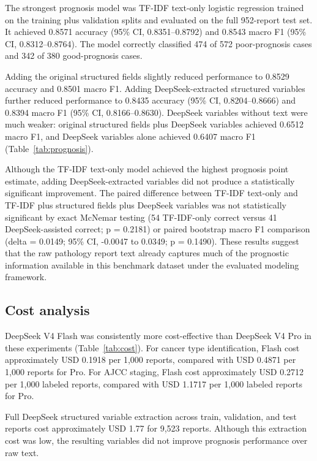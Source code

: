 \documentclass[pdflatex,sn-vancouver-num]{sn-jnl}
\begin{document}
The strongest prognosis model was TF-IDF text-only logistic regression trained on the training plus validation splits and evaluated on the full 952-report test set. It achieved 0.8571 accuracy (95\% CI, 0.8351--0.8792) and 0.8543 macro F1 (95\% CI, 0.8312--0.8764). The model correctly classified 474 of 572 poor-prognosis cases and 342 of 380 good-prognosis cases.

Adding the original structured fields slightly reduced performance to 0.8529 accuracy and 0.8501 macro F1. Adding DeepSeek-extracted structured variables further reduced performance to 0.8435 accuracy (95\% CI, 0.8204--0.8666) and 0.8394 macro F1 (95\% CI, 0.8166--0.8630). DeepSeek variables without text were much weaker: original structured fields plus DeepSeek variables achieved 0.6512 macro F1, and DeepSeek variables alone achieved 0.6407 macro F1 (Table~\ref{tab:prognosis}).

Although the TF-IDF text-only model achieved the highest prognosis point estimate, adding DeepSeek-extracted variables did not produce a statistically significant improvement. The paired difference between TF-IDF text-only and TF-IDF plus structured fields plus DeepSeek variables was not statistically significant by exact McNemar testing (54 TF-IDF-only correct versus 41 DeepSeek-assisted correct; p = 0.2181) or paired bootstrap macro F1 comparison (delta = 0.0149; 95\% CI, -0.0047 to 0.0349; p = 0.1490). These results suggest that the raw pathology report text already captures much of the prognostic information available in this benchmark dataset under the evaluated modeling framework.

\subsection{Cost analysis}\label{subsec:costresults}

DeepSeek V4 Flash was consistently more cost-effective than DeepSeek V4 Pro in these experiments (Table~\ref{tab:cost}). For cancer type identification, Flash cost approximately USD 0.1918 per 1,000 reports, compared with USD 0.4871 per 1,000 reports for Pro. For AJCC staging, Flash cost approximately USD 0.2712 per 1,000 labeled reports, compared with USD 1.1717 per 1,000 labeled reports for Pro.

Full DeepSeek structured variable extraction across train, validation, and test reports cost approximately USD 1.77 for 9,523 reports. Although this extraction cost was low, the resulting variables did not improve prognosis performance over raw text.
\end{document}
